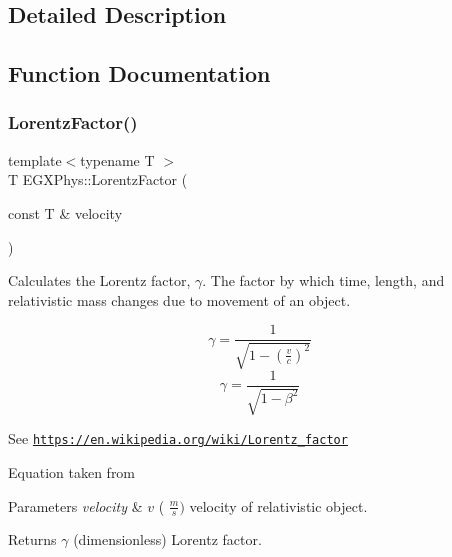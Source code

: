 \subsection{Detailed Description}


\subsection{Function Documentation}
\mbox{\label{group___lorentz_factor_ga5f9b11c1f4c3ae26a7e64f02c22d5a75}} 
\subsubsection{\texorpdfstring{Lorentz\+Factor()}{LorentzFactor()}}
{\footnotesize\ttfamily template$<$typename T $>$ \\
T E\+G\+X\+Phys\+::\+Lorentz\+Factor (\begin{DoxyParamCaption}\item[{const T \&}]{velocity }\end{DoxyParamCaption})}



Calculates the Lorentz factor, $\gamma$. The factor by which time, length, and relativistic mass changes due to movement of an object. 

\[\gamma=\frac{1}{\sqrt{1-(\frac{v}{c})^2}}\] \[\gamma=\frac{1}{\sqrt{1-\beta^2}}\]

See \href{https://en.wikipedia.org/wiki/Lorentz_factor}{\tt https\+://en.\+wikipedia.\+org/wiki/\+Lorentz\+\_\+factor}

Equation taken from


\begin{DoxyParams}{Parameters}
{\em velocity} & $v$ ( $\frac{m}{s})$ velocity of relativistic object. \\
\hline
\end{DoxyParams}
\begin{DoxyReturn}{Returns}
$\gamma$ (dimensionless) Lorentz factor. 
\end{DoxyReturn}
\mbox{\label{group___lorentz_factor_ga601de8c039be89a9abea22bc459436c9}} 
